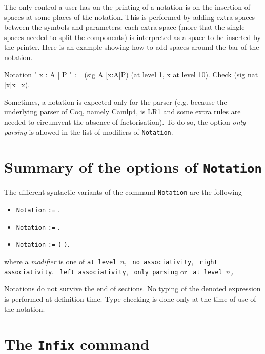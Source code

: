 {The only control a user has on the printing of a notation is on the
insertion of spaces at some places of the notation. This is performed
by adding extra spaces between the symbols and parameters: each extra
space (more that the single spaces needed to split the components) is
interpreted as a space to be inserted by the printer. Here is an
example showing how to add spaces around the bar of the notation.

\begin{coq_example}
Notation "{ x : A  |  P }" := (sig A [x:A]P)
  (at level 1, x at level 10).
Check (sig nat [x]x=x).
\end{coq_example}

\Rem
Sometimes, a notation is expected only for the parser (e.g. because
the underlying parser of Coq, namely Camlp4, is LR1 and some extra
rules are needed to circumvent the absence of factorisation).
To do so, the option {\em only parsing} is allowed in the list of modifiers of
\texttt{Notation}.

\section{Summary of the options of \texttt{Notation}}

The different syntactic variants of the command \texttt{Notation} are
the following

\begin{itemize}

\item \texttt{Notation} {\str} \texttt{:=} {\term}.

\item \texttt{Notation} {\ident} \texttt{:=} {\term}.

\item \texttt{Notation} {\str} \texttt{:=} {\term} {\tt (}  {\tt )}.

\end{itemize}

where a {\em modifier} is one of \texttt{at level $n$},
\texttt{ no associativity}, \texttt{ right
associativity}, \texttt{ left associativity}, \texttt{ only parsing} or
\texttt{ \nelist{\ident}{,} at level $n$, }

Notations do not survive the end of sections. No typing of the denoted
expression is performed at definition time. Type-checking is done only
at the time of use of the notation.

\section{The \texttt{Infix} command}

}
